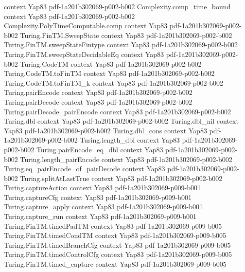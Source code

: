 \begin{theorem}
  {context}
  {Yap83}
  {pdf-1a201b302069-p002-b002}
\proofstep
  {Complexity.comp_time_bound}
  {context}
  {Yap83}
  {pdf-1a201b302069-p002-b002}
\proofstep
  {Complexity.PolyTimeComputable.comp}
  {context}
  {Yap83}
  {pdf-1a201b302069-p002-b002}
\proofstep
  {Turing.FinTM.SweepState}
  {context}
  {Yap83}
  {pdf-1a201b302069-p002-b002}
\proofstep
  {Turing.FinTM.sweepStateFintype}
  {context}
  {Yap83}
  {pdf-1a201b302069-p002-b002}
\proofstep
  {Turing.FinTM.sweepStateDecidableEq}
  {context}
  {Yap83}
  {pdf-1a201b302069-p002-b002}
\proofstep
  {Turing.CodeTM}
  {context}
  {Yap83}
  {pdf-1a201b302069-p002-b002}
\proofstep
  {Turing.CodeTM.toFinTM}
  {context}
  {Yap83}
  {pdf-1a201b302069-p002-b002}
\proofstep
  {Turing.CodeTM.toFinTM_k}
  {context}
  {Yap83}
  {pdf-1a201b302069-p002-b002}
\proofstep
  {Turing.pairEncode}
  {context}
  {Yap83}
  {pdf-1a201b302069-p002-b002}
\proofstep
  {Turing.pairDecode}
  {context}
  {Yap83}
  {pdf-1a201b302069-p002-b002}
\proofstep
  {Turing.pairDecode_pairEncode}
  {context}
  {Yap83}
  {pdf-1a201b302069-p002-b002}
\proofstep
  {Turing.dbl}
  {context}
  {Yap83}
  {pdf-1a201b302069-p002-b002}
\proofstep
  {Turing.dbl_nil}
  {context}
  {Yap83}
  {pdf-1a201b302069-p002-b002}
\proofstep
  {Turing.dbl_cons}
  {context}
  {Yap83}
  {pdf-1a201b302069-p002-b002}
\proofstep
  {Turing.length_dbl}
  {context}
  {Yap83}
  {pdf-1a201b302069-p002-b002}
\proofstep
  {Turing.pairEncode_eq_dbl}
  {context}
  {Yap83}
  {pdf-1a201b302069-p002-b002}
\proofstep
  {Turing.length_pairEncode}
  {context}
  {Yap83}
  {pdf-1a201b302069-p002-b002}
\proofstep
  {Turing.eq_pairEncode_of_pairDecode}
  {context}
  {Yap83}
  {pdf-1a201b302069-p002-b002}
\proofstep
  {Turing.splitAtLastTrue}
  {context}
  {Yap83}
  {pdf-1a201b302069-p002-b002}
\proofstep
  {Turing.captureAction}
  {context}
  {Yap83}
  {pdf-1a201b302069-p009-b001}
\proofstep
  {Turing.captureCfg}
  {context}
  {Yap83}
  {pdf-1a201b302069-p009-b001}
\proofstep
  {Turing.capture_apply}
  {context}
  {Yap83}
  {pdf-1a201b302069-p009-b001}
\proofstep
  {Turing.capture_run}
  {context}
  {Yap83}
  {pdf-1a201b302069-p009-b001}
\proofstep
  {Turing.FinTM.timedPadTM}
  {context}
  {Yap83}
  {pdf-1a201b302069-p009-b005}
\proofstep
  {Turing.FinTM.timedCondTM}
  {context}
  {Yap83}
  {pdf-1a201b302069-p009-b005}
\proofstep
  {Turing.FinTM.timedBranchCfg}
  {context}
  {Yap83}
  {pdf-1a201b302069-p009-b005}
\proofstep
  {Turing.FinTM.timedControlCfg}
  {context}
  {Yap83}
  {pdf-1a201b302069-p009-b005}
\proofstep
  {Turing.FinTM.timed_capture}
  {context}
  {Yap83}
  {pdf-1a201b302069-p009-b005}

\end{theorem}
